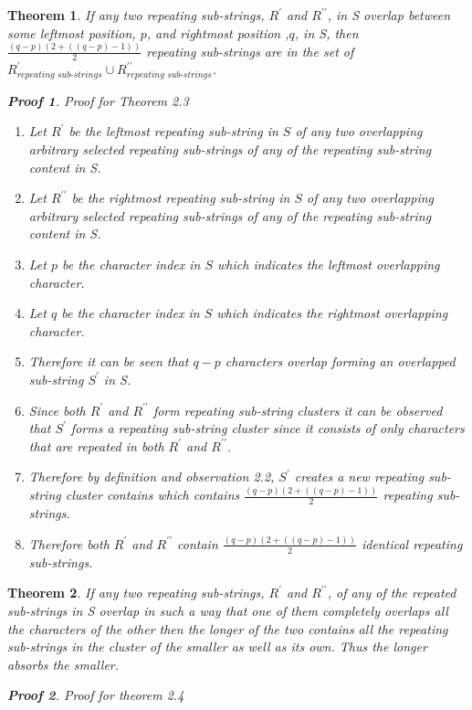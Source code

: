 \documentclass[12pt]{article}
\newtheorem{thm}{Theorem}[section]
\newtheorem{prf}{Proof}[section]
\begin{document}
\begin{flushleft}
	\begin{thm}
	If any two repeating sub-strings, $R^{\prime}$ and $R^{\prime\prime}$, in S overlap between some leftmost position, $p$, and rightmost position ,$q$, in S, then $\frac{(q - p)(2 + ((q - p)-1))}{2}$ repeating sub-strings are in the set of $R^{\prime}_{\textit{repeating sub-strings}} \cup R^{\prime\prime}_{\textit{repeating sub-strings}}$.
		\begin{prf} Proof for Theorem 2.3
			\begin{enumerate}
				\item Let $R^{\prime}$ be the leftmost repeating sub-string in $S$ of any two overlapping arbitrary selected repeating sub-strings of any of the repeating sub-string content in S.  
				\item Let $R^{\prime\prime}$ be the rightmost repeating sub-string in $S$ of any two overlapping arbitrary selected repeating sub-strings of any of the repeating sub-string content in S.
				\item Let $p$ be the character index in $S$ which indicates the leftmost overlapping character.
				\item Let $q$ be the character index in $S$ which indicates the rightmost overlapping character.
				\item Therefore it can be seen that $q - p$ characters overlap forming an overlapped sub-string $S^{\prime}$ in S.
				\item Since both $R^{\prime}$ and $R^{\prime\prime}$ form repeating sub-string clusters it can be observed that $S^{\prime}$ forms a repeating sub-string cluster since it consists of only characters that are repeated in both $R^{\prime}$ and $R^{\prime\prime}$.
				\item Therefore by definition and observation 2.2, $S^{\prime}$ creates a new repeating sub-string cluster contains which contains $\frac{(q - p)(2 + ((q - p)-1))}{2}$ repeating sub-strings.
				\item Therefore both $R^{\prime}$ and $R^{\prime\prime}$ contain $\frac{(q - p)(2 + ((q - p)-1))}{2}$ identical repeating sub-strings.
			\end{enumerate}
		\end{prf}
	\end{thm}
	
	\begin{thm}
	If any two repeating sub-strings, $R^{\prime}$ and $R^{\prime\prime}$, of any of the repeated sub-strings in S overlap in such a way that one of them completely overlaps all the characters of the other then the longer of the two contains all the repeating sub-strings in the cluster of the smaller as well as its own. Thus the longer absorbs the smaller.
		\begin{prf} Proof for theorem 2.4
			\begin{enumerate}
			

\end{enumerate}
\end{prf}
\end{thm}
\end{flushleft}
\end{document}
